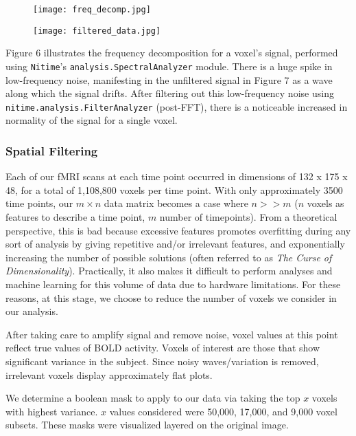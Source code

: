 \begin{figure}[H]
\centering
\begin{minipage}{.5\textwidth}
	\centering
	\texttt{[image: freq\_decomp.jpg]}
	\label{fig:test5}
\end{minipage}%
\begin{minipage}{.5\textwidth}
  \centering
  \texttt{[image: filtered\_data.jpg]}
  \label{fig:test1}
\end{minipage}
\end{figure}

\par Figure 6 illustrates the frequency decomposition for a voxel's signal, performed using \texttt{Nitime}'s \texttt{analysis.SpectralAnalyzer} module. There is a huge spike in low-frequency noise, manifesting in the unfiltered signal in Figure 7 as a wave along which the signal drifts. After filtering out this low-frequency noise using \texttt{nitime.analysis.FilterAnalyzer} (post-FFT), there is a noticeable increased in normality of the signal for a single voxel.

\subsubsection{Spatial Filtering}
\par Each of our fMRI scans at each time point occurred in dimensions of 132 x 175 x 48, for a total of 1,108,800  voxels per time point. With only approximately 3500 time points, our $m\times n$ data matrix becomes a case where $n >> m$ ($n$ voxels as features to describe a time point, $m$ number of timepoints). From a theoretical perspective, this is bad because excessive features promotes overfitting during any sort of analysis by giving repetitive and/or irrelevant features, and exponentially increasing the number of possible solutions (often referred to as \textit{The Curse of Dimensionality}). Practically, it also makes it difficult to perform analyses and machine learning for this volume of data due to hardware limitations. For these reasons, at this stage, we choose to reduce the number of voxels we consider in our analysis.
\par After taking care to amplify signal and remove noise, voxel values at this point reflect true values of BOLD activity. Voxels of interest are those that show significant variance in the subject. Since noisy waves/variation is removed, irrelevant voxels display approximately flat plots. 
\par We determine a boolean mask to apply to our data via taking the top $x$ voxels with highest variance. $x$ values considered were 50,000, 17,000, and 9,000 voxel subsets. These masks were visualized layered on the original image.

